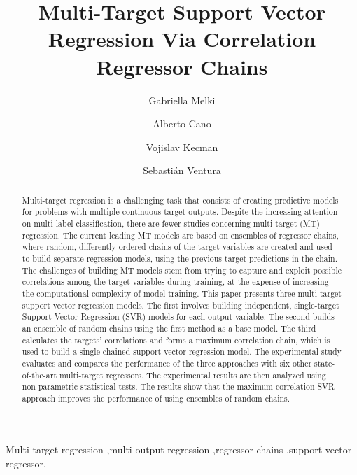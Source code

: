 \documentclass[preprint,12pt]{elsarticle}
\begin{document}
\begin{frontmatter}

\title{Multi-Target Support Vector Regression Via Correlation Regressor Chains}

\author[a]{Gabriella Melki}\author[a]{Alberto Cano}\author[a]{Vojislav Kecman}\author[b,c]{Sebasti\'an Ventura}

\address[a]{Department of Computer Science, Virginia Commonwealth University, USA}
\address[b]{Department of Computer Science and Numerical Analysis, University of Cordoba, Spain}
\address[c]{Department of Computer Science, King Abdulaziz University, Saudi Arabia Kingdom}

\begin{abstract}
Multi-target regression is a challenging task that consists of creating predictive models for problems with multiple continuous target outputs. Despite the increasing attention on multi-label classification, there are fewer studies concerning multi-target (MT) regression. The current leading MT models are based on ensembles of regressor chains, where random, differently ordered chains of the target variables are created and used to build separate regression models, using the previous target predictions in the chain. The challenges of building MT models stem from trying to capture and exploit possible correlations among the target variables during training, at the expense of increasing the computational complexity of model training. 
This paper presents three multi-target support vector regression models. The first involves building independent, single-target Support Vector Regression (SVR) models for each output variable. The second builds an ensemble of random chains using the first method as a base model. The third calculates the targets' correlations and forms a maximum correlation chain, which is used to build a single chained support vector regression model. The experimental study evaluates and compares the performance of the three approaches with six other state-of-the-art multi-target regressors. The experimental results are then analyzed using non-parametric statistical tests. The results show that the maximum correlation SVR approach improves the performance of using ensembles of random chains.
\end{abstract}

\begin{keyword}
Multi-target regression \sep multi-output regression \sep regressor chains \sep support vector regressor.
\end{keyword}

\end{frontmatter}
\end{document}
